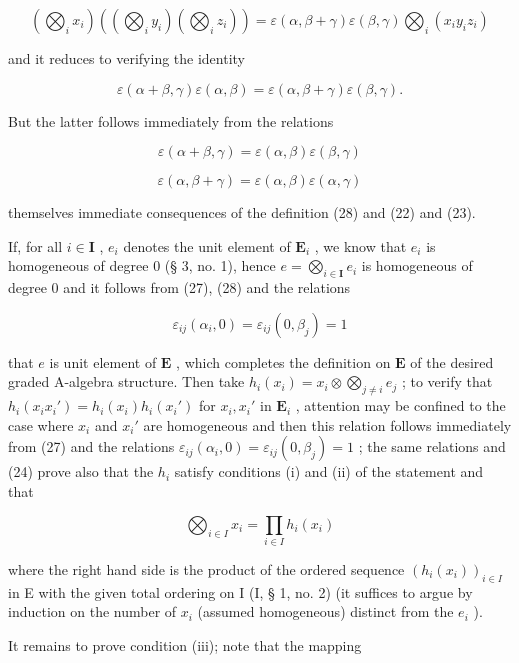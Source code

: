 \[
\left(\bigotimes_ {i} x _ {i}\right) \left(\left(\bigotimes_ {i} y _ {i}\right) \left(\bigotimes_ {i} z _ {i}\right)\right) = \varepsilon (\alpha , \beta + \gamma) \varepsilon (\beta , \gamma) \bigotimes_ {i} (x _ {i} y _ {i} z _ {i})
\]

and it reduces to verifying the identity

\[
\varepsilon (\alpha + \beta , \gamma) \varepsilon (\alpha , \beta) = \varepsilon (\alpha , \beta + \gamma) \varepsilon (\beta , \gamma).
\]

But the latter follows immediately from the relations

\[
\varepsilon (\alpha + \beta , \gamma) = \varepsilon (\alpha , \beta) \varepsilon (\beta , \gamma)
\]

\[
\varepsilon (\alpha , \beta + \gamma) = \varepsilon (\alpha , \beta) \varepsilon (\alpha , \gamma)
\]

themselves immediate consequences of the definition (28) and (22) and (23).

If, for all \(i \in \mathbf{I}\) , \(e_i\) denotes the unit element of \(\mathbf{E}_i\) , we know that \(e_i\) is homogeneous of degree 0 (§ 3, no. 1), hence \(e = \bigotimes_{i \in \mathbf{I}} e_i\) is homogeneous of degree 0 and it follows from (27), (28) and the relations

\[
\varepsilon_ {i j} (\alpha_ {i}, 0) = \varepsilon_ {i j} (0, \beta_ {j}) = 1
\]

that \(e\) is unit element of \(\mathbf{E}\) , which completes the definition on \(\mathbf{E}\) of the desired graded A-algebra structure. Then take \(h_i(x_i) = x_i \otimes \bigotimes_{j \neq i} e_j\) ; to verify that \(h_i(x_i x_i') = h_i(x_i) h_i(x_i')\) for \(x_i, x_i'\) in \(\mathbf{E}_i\) , attention may be confined to the case where \(x_i\) and \(x_i'\) are homogeneous and then this relation follows immediately from (27) and the relations \(\varepsilon_{ij}(\alpha_i, 0) = \varepsilon_{ij}(0, \beta_j) = 1\) ; the same relations and (24) prove also that the \(h_i\) satisfy conditions (i) and (ii) of the statement and that

\[
\bigotimes_ {i \in I} x _ {i} = \prod_ {i \in I} h _ {i} (x _ {i})\tag{29}
\]

where the right hand side is the product of the ordered sequence \((h_i(x_i))_{i\in I}\) in E with the given total ordering on I (I, § 1, no. 2) (it suffices to argue by induction on the number of \(x_{i}\) (assumed homogeneous) distinct from the \(e_i\) ).

It remains to prove condition (iii); note that the mapping

